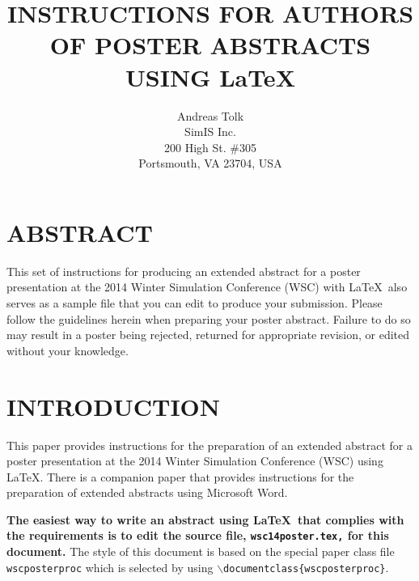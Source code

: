 \documentclass{wscposterproc}
\begin{document}
%
%
%

\title{INSTRUCTIONS FOR AUTHORS OF POSTER ABSTRACTS USING \LaTeX}

\author{Andreas Tolk \\[12pt]
SimIS Inc.\\
200 High St. \#305\\
Portsmouth, VA 23704, USA
}

\maketitle


\section*{ABSTRACT}

This set of instructions for producing an extended abstract for a poster presentation at the 2014 Winter Simulation Conference (WSC) with \LaTeX\ also serves as a sample file that you can edit to produce your submission. Please follow the guidelines herein when preparing your poster abstract. Failure to do so may result in a poster being rejected, returned for appropriate revision, or edited without your knowledge.

\section{INTRODUCTION}
This paper provides instructions for the preparation of an extended abstract for a poster presentation at the 2014 Winter Simulation Conference (WSC) using \LaTeX. There is a companion paper that provides instructions for the preparation of extended abstracts using Microsoft Word.

\textbf{The easiest way to write an abstract using \LaTeX\ that complies with the
requirements is to edit the source file, {\tt wsc14poster.tex,} for this document.}
The style of this document is based on the special paper class file {\tt wscposterproc} which is selected by using {\tt $\backslash$documentclass\{wscposterproc\}}.
\end{document}
